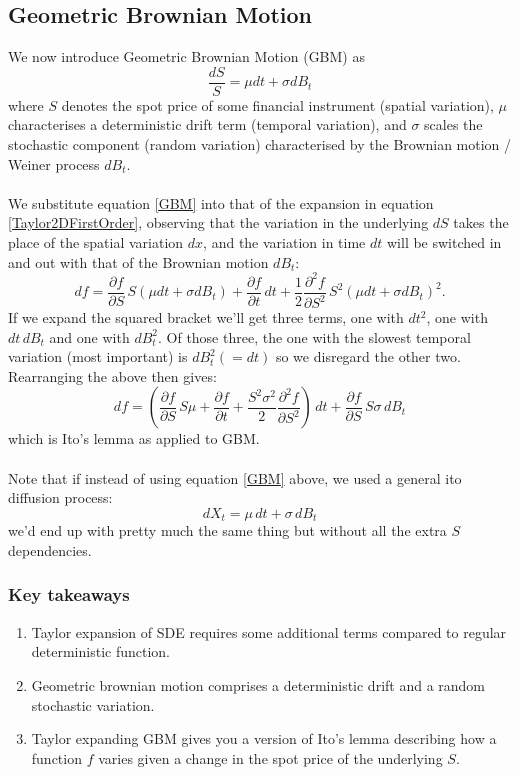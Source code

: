 \documentclass[12pt]{article}
\newcommand{\dpart}[2]{\frac{\partial #1}{\partial #2}}
\begin{document}
\subsection{Geometric Brownian Motion}
We now introduce Geometric Brownian Motion (GBM) as
\begin{equation}\label{GBM}
	\frac{dS}{S}=\mu dt+\sigma dB_t
\end{equation}
where $S$ denotes the spot price of some financial instrument (spatial variation), $\mu$ characterises a deterministic drift term (temporal variation), and $\sigma$ scales the stochastic component (random variation) characterised by the Brownian motion / Weiner process $dB_t$.\\
\\
We substitute equation \ref{GBM} into that of the expansion in equation \ref{Taylor2DFirstOrder}, observing that the variation in the underlying $dS$ takes the place of the spatial variation $dx$, and the variation in time $dt$ will be switched in and out with that of the Brownian motion $dB_t$:
\begin{equation}
	df=\dpart{f}{S}\,S\left(\mu dt+\sigma dB_t\right)+\dpart{f}{t}\,dt+\frac{1}{2}\frac{\partial^2 f}{\partial S^2}\,S^2\left(\mu dt+\sigma dB_t\right)^2.
\end{equation}
If we expand the squared bracket we'll get three terms, one with $dt^2$, one with $dt\,dB_t$ and one with $dB_t^2$. Of those three, the one with the slowest temporal variation (most important) is $dB_t^2(=dt)$ so we disregard the other two. Rearranging the above then gives:
\begin{equation}
	df=\left(\dpart{f}{S}\,S\mu+\dpart{f}{t}+\frac{S^2\sigma^2}{2}\frac{\partial^2 f}{\partial S^2}\right)\,dt + \dpart{f}{S}\,S\sigma\,dB_t
\end{equation}
which is Ito's lemma as applied to GBM.\\
\\
Note that if instead of using equation \ref{GBM} above, we used a general ito diffusion process:
\begin{equation}
	dX_t=\mu\,dt+\sigma\,dB_t
\end{equation}
we'd end up with pretty much the same thing but without all the extra $S$ dependencies.
\subsubsection{Key takeaways}
\begin{enumerate}
	\item Taylor expansion of SDE requires some additional terms compared to regular deterministic function.
	\item Geometric brownian motion comprises a deterministic drift and a random stochastic variation.
	\item Taylor expanding GBM gives you a version of Ito's lemma describing how a function $f$ varies given a change in the spot price of the underlying $S$.
\end{enumerate}
\end{document}
